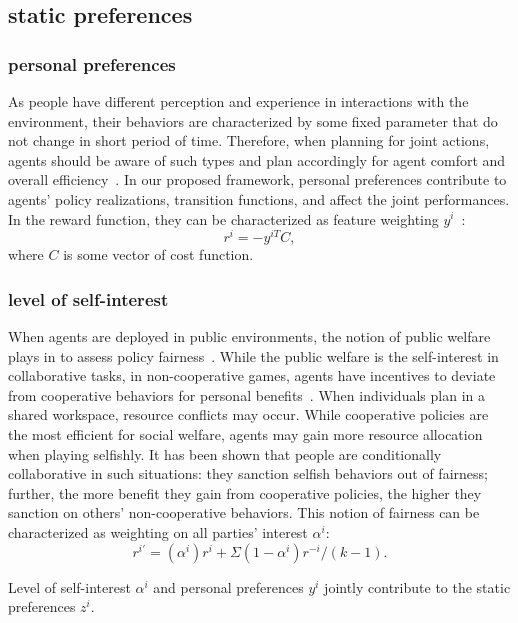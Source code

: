 \documentclass[letterpaper, 10 pt, conference]{ieeeconf}  %
\begin{document}
\subsection{static preferences}
\subsubsection{personal preferences}
As people have different perception and experience in interactions with the 
environment, their behaviors are characterized by some fixed parameter that 
do not change in short period of time. Therefore, when planning for joint 
actions, agents should be aware of such types and plan accordingly for agent 
comfort and overall efficiency~\cite{gombolay2015coordination}. In our 
proposed framework, personal preferences contribute to agents' policy 
realizations, transition functions, and affect the joint performances. In the 
reward function, they can be characterized as feature weighting $y^i$~\cite{dorsa2017active}:
\begin{equation}
  r^i = -y^{iT}C, 
\end{equation}
where $C$ is some vector of cost function.
\subsubsection{level of self-interest}
When agents are deployed in public environments, the notion of public welfare 
plays in to assess policy fairness~\cite{fehr2004social}. While the public welfare is the 
self-interest in collaborative tasks, in non-cooperative games, agents have incentives to 
deviate from cooperative behaviors for personal benefits~\cite{fujiwara2015non}.  
When individuals plan in a shared workspace, resource conflicts may occur. 
While cooperative policies are the most efficient for social welfare, agents 
may gain more resource allocation when playing selfishly. It has been shown 
that people are conditionally collaborative in such situations: they sanction 
selfish behaviors out of fairness; further, the more benefit they gain from 
cooperative policies, the higher they sanction on others' non-cooperative 
behaviors. This notion of fairness can be characterized as weighting on all 
parties' interest $\alpha^i$:
\begin{equation}
  r^{i'} = (\alpha^i)r^i+ \Sigma(1-\alpha^i)r^{-i}/(k-1).
\end{equation}

Level of self-interest $\alpha^i$ and personal preferences $y^i$ jointly contribute to the 
static preferences $z^i$.
\end{document}
